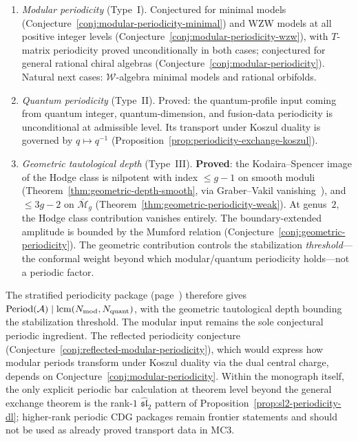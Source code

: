 \begin{enumerate}[label=\textup{(\alph*)}]
\item \emph{Modular periodicity} (Type~I).  Conjectured for minimal
  models (Conjecture~\ref{conj:modular-periodicity-minimal}) and WZW
  models at all positive integer levels
  (Conjecture~\ref{conj:modular-periodicity-wzw}), with $T$-matrix
  periodicity proved unconditionally in both cases; conjectured for
  general rational chiral algebras
  (Conjecture~\ref{conj:modular-periodicity}).  Natural next cases:
  $\mathcal{W}$-algebra minimal models and rational orbifolds.
\item \emph{Quantum periodicity} (Type~II).
  Proved: the quantum-profile input coming from quantum integer,
  quantum-dimension, and fusion-data periodicity is unconditional at
  admissible level.  Its transport under Koszul duality is governed by
  $q \mapsto q^{-1}$
  (Proposition~\ref{prop:periodicity-exchange-koszul}).
\item \emph{Geometric tautological depth} (Type~III).
  \textbf{Proved}: the Kodaira--Spencer image of the Hodge class is
  nilpotent with index $\leq g - 1$ on smooth moduli
  (Theorem~\ref{thm:geometric-depth-smooth}, via Graber--Vakil
  vanishing~\cite{GraVak05}), and $\leq 3g - 2$ on
  $\overline{\mathcal{M}}_g$
  (Theorem~\ref{thm:geometric-periodicity-weak}).  At genus~$2$, the
  Hodge class contribution vanishes entirely.  The boundary-extended
  amplitude is bounded by the Mumford relation
  (Conjecture~\ref{conj:geometric-periodicity}).  The geometric
  contribution controls the stabilization \emph{threshold}---the
  conformal weight beyond which modular/quantum periodicity holds---not
  a periodic factor.
\end{enumerate}
The stratified periodicity package
(page~\pageref{conj:complete-periodicity-classification}) therefore
gives
$\mathrm{Period}(\mathcal{A}) \mid \mathrm{lcm}(N_{\mathrm{mod}},
N_{\mathrm{quant}})$, with the geometric tautological depth
bounding the stabilization threshold.  The modular input remains the
sole conjectural periodic ingredient.
The reflected periodicity conjecture
(Conjecture~\ref{conj:reflected-modular-periodicity}), which
would express how modular periods transform under Koszul duality
via the dual central charge, depends on
Conjecture~\ref{conj:modular-periodicity}.
Within the monograph itself, the only explicit periodic bar calculation
at theorem level beyond the general exchange theorem is the rank-$1$
$\widehat{\mathfrak{sl}}_2$ pattern of
Proposition~\ref{prop:sl2-periodicity-dl}; higher-rank periodic CDG
packages remain frontier statements and should not be used as already
proved transport data in MC3.


